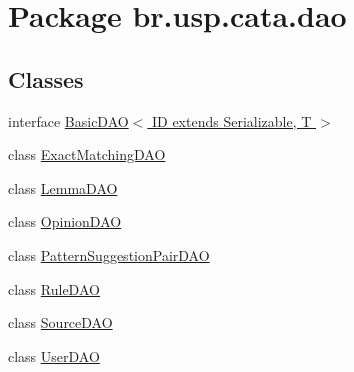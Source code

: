 \hypertarget{namespacebr_1_1usp_1_1cata_1_1dao}{\section{Package br.\+usp.\+cata.\+dao}
\label{namespacebr_1_1usp_1_1cata_1_1dao}
}
\subsection*{Classes}
\begin{DoxyCompactItemize}
\item 
interface \hyperlink{interfacebr_1_1usp_1_1cata_1_1dao_1_1_basic_d_a_o_3_01_i_d_01extends_01_serializable_00_01_t_01_4}{Basic\+D\+A\+O$<$ I\+D extends Serializable, T $>$}
\item 
class \hyperlink{classbr_1_1usp_1_1cata_1_1dao_1_1_exact_matching_d_a_o}{Exact\+Matching\+D\+A\+O}
\item 
class \hyperlink{classbr_1_1usp_1_1cata_1_1dao_1_1_lemma_d_a_o}{Lemma\+D\+A\+O}
\item 
class \hyperlink{classbr_1_1usp_1_1cata_1_1dao_1_1_opinion_d_a_o}{Opinion\+D\+A\+O}
\item 
class \hyperlink{classbr_1_1usp_1_1cata_1_1dao_1_1_pattern_suggestion_pair_d_a_o}{Pattern\+Suggestion\+Pair\+D\+A\+O}
\item 
class \hyperlink{classbr_1_1usp_1_1cata_1_1dao_1_1_rule_d_a_o}{Rule\+D\+A\+O}
\item 
class \hyperlink{classbr_1_1usp_1_1cata_1_1dao_1_1_source_d_a_o}{Source\+D\+A\+O}
\item 
class \hyperlink{classbr_1_1usp_1_1cata_1_1dao_1_1_user_d_a_o}{User\+D\+A\+O}
\end{DoxyCompactItemize}
